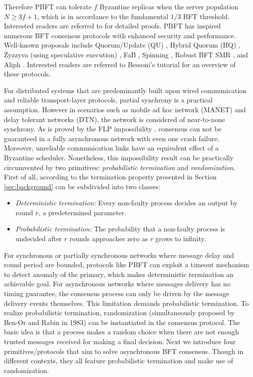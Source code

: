Therefore PBFT can tolerate $f$ Byzantine replicas when the server population $N\geq3f+1$, which is in accordance to the fundamental $1/3$ BFT threshold.
{\color{\rcolor}
Interested readers are referred to  for detailed proofs.
}
PBFT has inspired numerous BFT consensus protocols with enhanced security and performance. Well-known proposals include Quorum/Update (QU) , Hybrid Quorum (HQ) , Zyzzyva (using speculative execution) , FaB , Spinning , Robust BFT SMR , and Aliph . Interested readers are referred to Bessoni's tutorial  for an overview of these protocols.

\label{subsec:async-bft}
For distributed systems that are predominantly built upon wired communication and reliable transport-layer protocols, partial synchrony is a practical assumption. However in scenarios such as mobile ad hoc network (MANET) and delay tolerant networks (DTN), the network is considered of near-to-none synchrony.
As is proved by the FLP impossibility , consensus can not be guaranteed in a fully asynchronous network with even one crash failure. Moreover, unreliable communication links have an equivalent effect of a Byzantine scheduler. Nonetheless, this impossibility result can be practically circumvented by two primitives: \emph{probabilistic termination} and \emph{randomization}.
First of all, according to  the termination property presented in Section \ref{sec:background} can be subdivided into two classes:
\begin{itemize}
    \item \textit{Deterministic termination:} Every non-faulty process decides an output by round $r$, a predetermined parameter.
    \item \textit{Probabilistic termination:} The probability that a non-faulty process is undecided after $r$ rounds approaches zero as $r$ grows to infinity.
\end{itemize}
For synchronous or partially synchronous networks where message delay and round period are bounded, protocols like PBFT can exploit a timeout mechanism to detect anomaly of the primary, which makes deterministic termination an achievable goal. For asynchronous networks where messages delivery has no timing guarantee, the consensus process can only be driven by the message delivery events themselves. This limitation demands probabilistic termination. 
To realize probabilistic termination, randomization (simultaneously proposed by Ben-Or  and Rabin  in 1983) can be instantiated in the consensus protocol. The basic idea is that a process makes a random choice when there are not enough trusted messages received for making a final decision. 
Next we introduce four primitives/protocols that aim to solve asynchronous BFT consensus. Though in different contexts, they all feature probabilistic termination and make use of randomization.

